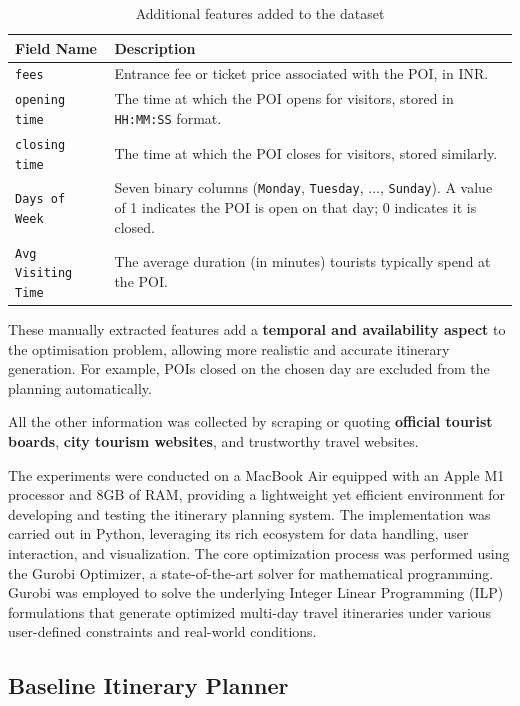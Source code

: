 \documentclass[sigconf,authordraft]{acmart}
\begin{document}
\begin{table}[H]
\centering
\begin{tabularx}{0.5\textwidth}{p{3cm} X}
\toprule
\textbf{Field Name} & \textbf{Description} \\
\midrule
\texttt{fees} & Entrance fee or ticket price associated with the POI, in INR. \\
\midrule
\texttt{opening time} & The time at which the POI opens for visitors, stored in \texttt{HH:MM:SS} format. \\
\midrule
\texttt{closing time} & The time at which the POI closes for visitors, stored similarly. \\
\midrule
\texttt{Days of Week} & Seven binary columns (\texttt{Monday}, \texttt{Tuesday}, ..., \texttt{Sunday}). A value of 1 indicates the POI is open on that day; 0 indicates it is closed. \\
\midrule
\texttt{Avg Visiting Time} & The average duration (in minutes) tourists typically spend at the POI. \\
\bottomrule
\end{tabularx}
\caption{Additional features added to the dataset}
\end{table}



These manually extracted features add a \textbf{temporal and availability aspect} to the optimisation problem, allowing more realistic and accurate itinerary generation. For example, POIs closed on the chosen day are excluded from the planning automatically.

All the other information was collected by scraping or quoting \textbf{official tourist boards}, \textbf{city tourism websites}, and trustworthy travel websites.

The experiments were conducted on a MacBook Air equipped with an Apple M1 processor and 8GB of RAM, providing a lightweight yet efficient environment for developing and testing the itinerary planning system. The implementation was carried out in Python, leveraging its rich ecosystem for data handling, user interaction, and visualization. The core optimization process was performed using the Gurobi Optimizer, a state-of-the-art solver for mathematical programming. Gurobi was employed to solve the underlying Integer Linear Programming (ILP) formulations that generate optimized multi-day travel itineraries under various user-defined constraints and real-world conditions.

\subsection{Baseline Itinerary Planner}
\end{document}
